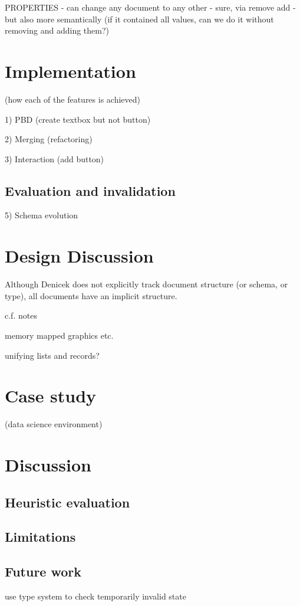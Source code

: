 \documentclass[sigconf]{acmart}
\begin{document}
PROPERTIES
- can change any document to any other - sure, via remove add - but also more semantically
(if it contained all values, can we do it without removing and adding them?)


\section{Implementation}
\label{sec:impl}
(how each of the features is achieved)


1) PBD (create textbox but not button)

2) Merging (refactoring)

3) Interaction (add button)

\subsection{Evaluation and invalidation}
\label{sec:impl-eval}

5) Schema evolution

\section{Design Discussion}


Although Denicek does not explicitly track document structure (or schema, or type), all documents
have an implicit structure.

c.f. notes

memory mapped graphics etc.

unifying lists and records?

\section{Case study}
(data science environment)

\section{Discussion}
\subsection{Heuristic evaluation}
\subsection{Limitations}
\subsection{Future work}
\label{sec:discuss-future}
use type system to check temporarily invalid state
\end{document}
